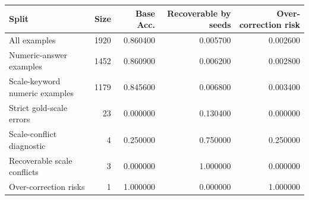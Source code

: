 \begin{tabular}{lrrrr}
\toprule
Split & Size & Base Acc. & Recoverable by seeds & Over-correction risk \\
\midrule
All examples & 1920 & 0.860400 & 0.005700 & 0.002600 \\
Numeric-answer examples & 1452 & 0.860900 & 0.006200 & 0.002800 \\
Scale-keyword numeric examples & 1179 & 0.845600 & 0.006800 & 0.003400 \\
Strict gold-scale errors & 23 & 0.000000 & 0.130400 & 0.000000 \\
Scale-conflict diagnostic & 4 & 0.250000 & 0.750000 & 0.250000 \\
Recoverable scale conflicts & 3 & 0.000000 & 1.000000 & 0.000000 \\
Over-correction risks & 1 & 1.000000 & 0.000000 & 1.000000 \\
\bottomrule
\end{tabular}
